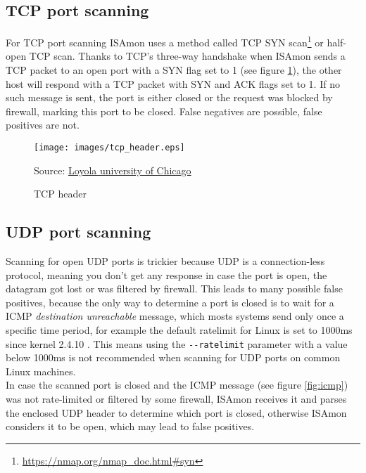 \documentclass[11pt,a4paper]{article}
\newcommand{\source}[1]{\caption*{Source: {#1}} }
\begin{document}
	\subsection{TCP port scanning}
		For TCP port scanning ISAmon uses a method called TCP SYN scan\footnote{\url{https://nmap.org/nmap_doc.html\#syn}} or half-open TCP scan. Thanks to TCP's three-way handshake when ISAmon sends a TCP packet to an open port with a SYN flag set to 1 (see figure \ref{fig:tcp_header}), the other host will respond with a TCP packet with SYN and ACK flags set to 1. If no such message is sent, the port is either closed or the request was blocked by firewall, marking this port to be closed. False negatives are possible, false positives are not.\\

		\begin{figure}[h]
			\centering
			\texttt{[image: images/tcp\_header.eps]}
			\caption{TCP header}
			\label{fig:tcp_header}
			\source{\href{http://intronetworks.cs.luc.edu/1/html/tcp.html}{Loyola university of Chicago}}
		\end{figure}
        

	\subsection{UDP port scanning}
		Scanning for open UDP ports is trickier because UDP is a connection-less protocol, meaning you don't get any response in case the port is open, the datagram got lost or was filtered by firewall. This leads to many possible false positives, because the only way to determine a port is closed is to wait for a ICMP \emph{destination unreachable} message, which mosts systems send only once a specific time period, for example the default ratelimit for Linux is set to 1000ms since kernel 2.4.10 \cite{man7:icmp}. This means using the \texttt{-{}-ratelimit} parameter with a value below 1000ms is not recommended when scanning for UDP ports on common Linux machines.\\
		In case the scanned port is closed and the ICMP message (see figure \ref{fig:icmp}) was not rate-limited or filtered by some firewall, ISAmon receives it and parses the enclosed UDP header to determine which port is closed, otherwise ISAmon considers it to be open, which may lead to false positives.



\newpage

\end{document}
